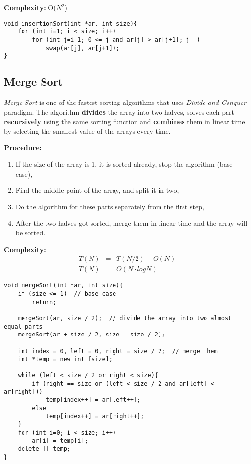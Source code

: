 \documentclass[12pt]{article}
\begin{document}
\textbf{Complexity: }
    O($N^{2}$).
	
\begin{verbatim}
void insertionSort(int *ar, int size){
    for (int i=1; i < size; i++)
        for (int j=i-1; 0 <= j and ar[j] > ar[j+1]; j--)
            swap(ar[j], ar[j+1]);
}
\end{verbatim}

\cleardoublepage

		\subsection{Merge Sort}

\textit{Merge Sort} is one of the fastest sorting algorithms that uses \textit{Divide and Conquer} paradigm. The algorithm \textbf{divides} the array into two halves, solves each part \textbf{recursively} using the same sorting function and \textbf{combines} them in linear time by selecting the smallest value of the arrays every time.

\textbf{Procedure: }
\begin{enumerate}
	\item If the size of the array is 1, it is sorted already, stop the algorithm (base case),
	\item Find the middle point of the array, and split it in two,
	\item Do the algorithm for these parts separately from the first step,
	\item After the two halves got sorted, merge them in linear time and the array will be sorted. 
\end{enumerate}	

\textbf{Complexity: }
\begin{eqnarray*}
	T(N) &=& T(N / 2) + O(N) \\
	T(N) &=& O(N \cdot logN)
\end{eqnarray*}

\begin{verbatim}
void mergeSort(int *ar, int size){
    if (size <= 1)  // base case
        return;
	
    mergeSort(ar, size / 2);  // divide the array into two almost equal parts
    mergeSort(ar + size / 2, size - size / 2);
	
    int index = 0, left = 0, right = size / 2;  // merge them 
    int *temp = new int [size];
	
    while (left < size / 2 or right < size){
        if (right == size or (left < size / 2 and ar[left] < ar[right]))
            temp[index++] = ar[left++];
        else 
            temp[index++] = ar[right++];
    }
    for (int i=0; i < size; i++)
        ar[i] = temp[i];
    delete [] temp;
}		
\end{verbatim}
\end{document}
